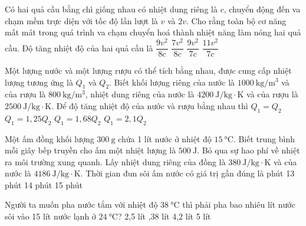 \begin{ex}
	Có hai quả cầu bằng chì giống nhau có nhiệt dung riêng là $c$, chuyển động đến va chạm mềm trực diện với tốc độ lần lượt là $v$ và $2v$. Cho rằng toàn bộ cơ năng mất mát trong quá trình va chạm chuyển hoá thành nhiệt năng làm nóng hai quả cầu. Độ tăng nhiệt độ của hai quả cầu là
		\choice
		{\True $\dfrac{9v^2}{8c}$}
		{$\dfrac{7v^2}{8c}$}
		{$\dfrac{9v^2}{7c}$}
		{$\dfrac{11v^2}{7c}$}
\end{ex}
\begin{ex}
Một lượng nước và một lượng rượu có thể tích bằng nhau, được cung cấp nhiệt lượng tương ứng là $Q_1$ và $Q_2$. Biết khối lượng riêng của nước là $\SI{1000}{\kilogram/\meter^3}$ và của rượu là $\SI{800}{\kilogram/\meter^3}$, nhiệt dung riêng của nước là $\SI{4200}{\joule/\kilogram\cdot\kelvin}$ và của rượu là $\SI{2500}{\joule/\kilogram\cdot\kelvin}$. Để độ tăng nhiệt độ của nước và rượu bằng nhau thì
	\choice
	{$Q_1=Q_2$}
	{$Q_1=1,25Q_2$}
	{$Q_1=1,68Q_2$}
	{\True $Q_1=2,1Q_2$}
\end{ex}
\begin{ex}
	Một ấm đồng khối lượng $\SI{300}{\gram}$ chứa 1 lít nước ở nhiệt độ $\SI{15}{\celsius}$. Biết trung bình mỗi giây bếp truyền cho ấm một nhiệt lượng là $\SI{500}{\joule}$. Bỏ qua sự hao phí về nhiệt ra môi trường xung quanh. Lấy nhiệt dung riêng của đồng là $\SI{380}{\joule/\kilogram\cdot\kelvin}$ và của nước là $\SI{4186}{\joule/\kilogram\cdot\kelvin}$. Thời gian đun sôi ấm nước có giá trị gần đúng là
	\choice
	{ phút}
	{13 phút}
	{14 phút}
	{15 phút}
\end{ex}
\begin{ex}
	Người ta muốn pha nước tắm với nhiệt độ $\SI{38}{\celsius}$ thì phải pha bao nhiêu lít nước sôi vào 15 lít nước lạnh ở $\SI{24}{\celsius}$?
	\choice
	{2,5 lít}
	{,38 lít}
	{4,2 lít}
	{5 lít}
\end{ex}

